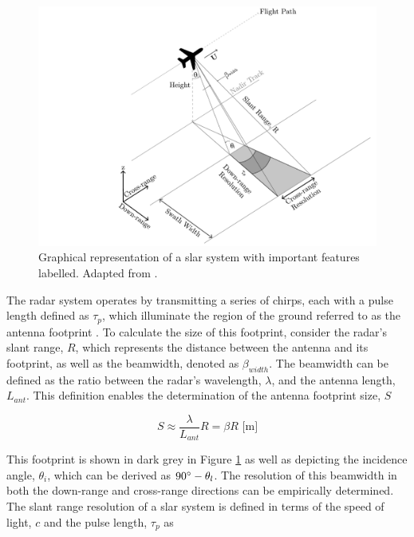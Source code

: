 \begin{figure}[H]
    \centering
    \includegraphics[width=.95\linewidth]{Figures/Theory/slarGeometry.pdf}
    \caption{Graphical representation of a \acs{slar} system with important features labelled. Adapted from \cite{Moreira2013,Meyer2019}.}
    \label{fig:theory.slarGeometry}
\end{figure}

The radar system operates by transmitting a series of chirps, each with a pulse length defined as $\tau_{p}$, which illuminate the region of the ground referred to as the antenna footprint \cite{Meyer2019}. To calculate the size of this footprint, consider the radar's slant range, $R$, which represents the distance between the antenna and its footprint, as well as the beamwidth, denoted as $\beta_{width}$. The beamwidth can be defined as the ratio between the radar's wavelength, $\lambda$, and the antenna length, $L_{ant}$. This definition enables the determination of the antenna footprint size, $S$ \cite{Meyer2019}

\begin{equation} \label{eq:rar.footprintSize}
    S \approx \frac{\lambda}{L_{ant}}R = \beta R \,\, \text{[m]}
\end{equation}

This footprint is shown in dark grey in Figure \ref{fig:theory.slarGeometry} as well as depicting the incidence angle, $\theta_{i}$, which can be derived as $90 \degree - \theta_{l}$. The resolution of this beamwidth in both the down-range and cross-range directions can be empirically determined. The slant range resolution of a \ac{slar} system is defined in terms of the speed of light, $c$ and the pulse length, $\tau_{p}$ as

